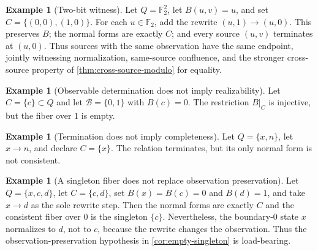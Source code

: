 \documentclass[11pt]{article}
\theoremstyle{definition}
\newtheorem{example}[theorem]{Example}
\theoremstyle{remark}
\numberwithin{equation}{section}
\newcommand{\cB}{\mathcal B}
\begin{document}
\begin{example}[Two-bit witness]\label{ex:two-bit-positive}
Let $Q=\mathbb F_2^2$, let $B(u,v)=u$, and set
$C=\{(0,0),(1,0)\}$.  For each $u\in\mathbb F_2$, add the rewrite
$(u,1)\to(u,0)$.  This preserves $B$; the normal forms
are exactly $C$; and every source $(u,v)$ terminates at $(u,0)$.  Thus sources
with the same observation have the same endpoint, jointly witnessing
normalization, same-source confluence, and the stronger cross-source property
of \cref{thm:cross-source-modulo} for equality.
\end{example}

\begin{example}[Observable determination does not imply realizability]
Let $C=\{c\}\subset Q$ and let $\cB=\{0,1\}$ with $B(c)=0$.  The restriction $B|_C$ is injective, but the fiber over $1$ is empty.
\end{example}

\begin{example}[Termination does not imply completeness]
Let $Q=\{x,n\}$, let $x\to n$, and declare $C=\{x\}$.  The relation terminates, but its only normal form is not consistent.
\end{example}

\begin{example}[A singleton fiber does not replace observation preservation]
Let $Q=\{x,c,d\}$, let $C=\{c,d\}$, set
$B(x)=B(c)=0$ and $B(d)=1$, and take $x\to d$ as the sole rewrite step.
Then the normal forms are exactly $C$ and the consistent fiber over $0$ is the
singleton $\{c\}$.  Nevertheless, the boundary-$0$ state $x$ normalizes to
$d$, not to $c$, because the rewrite changes the observation.  Thus the
observation-preservation hypothesis in \cref{cor:empty-singleton} is
load-bearing.
\end{example}
\end{document}
